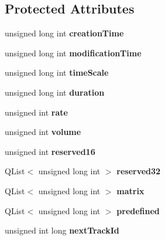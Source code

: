 \subsection*{Protected Attributes}
\begin{DoxyCompactItemize}
\item 
\hypertarget{class_movie_header_box_aa10ec3645b9839b739be8dc56eb5f080}{unsigned long int {\bfseries creation\-Time}}\label{class_movie_header_box_aa10ec3645b9839b739be8dc56eb5f080}

\item 
\hypertarget{class_movie_header_box_a5c568e1ff611aca7abda522ac1d20f38}{unsigned long int {\bfseries modification\-Time}}\label{class_movie_header_box_a5c568e1ff611aca7abda522ac1d20f38}

\item 
\hypertarget{class_movie_header_box_acf7962fac07a68e97018f76a600064e5}{unsigned long int {\bfseries time\-Scale}}\label{class_movie_header_box_acf7962fac07a68e97018f76a600064e5}

\item 
\hypertarget{class_movie_header_box_ac8813c7356944b5efcc4d5ccbce008dc}{unsigned long int {\bfseries duration}}\label{class_movie_header_box_ac8813c7356944b5efcc4d5ccbce008dc}

\item 
\hypertarget{class_movie_header_box_af82b82415e8682aba63e7a48a438b0fd}{unsigned int {\bfseries rate}}\label{class_movie_header_box_af82b82415e8682aba63e7a48a438b0fd}

\item 
\hypertarget{class_movie_header_box_a8faaa6dd6ba2e876bb36055f5274f437}{unsigned int {\bfseries volume}}\label{class_movie_header_box_a8faaa6dd6ba2e876bb36055f5274f437}

\item 
\hypertarget{class_movie_header_box_abebcda3372e107c07862cadc2a6353f2}{unsigned int {\bfseries reserved16}}\label{class_movie_header_box_abebcda3372e107c07862cadc2a6353f2}

\item 
\hypertarget{class_movie_header_box_af6b0a84485c8b8a62c0784614f0c9ee6}{Q\-List$<$ unsigned long int $>$ {\bfseries reserved32}}\label{class_movie_header_box_af6b0a84485c8b8a62c0784614f0c9ee6}

\item 
\hypertarget{class_movie_header_box_af7658e6d8db02f20faaecbc800865fe8}{Q\-List$<$ unsigned long int $>$ {\bfseries matrix}}\label{class_movie_header_box_af7658e6d8db02f20faaecbc800865fe8}

\item 
\hypertarget{class_movie_header_box_a4226b61569d5fbcae27d4fccbde0af8d}{Q\-List$<$ unsigned long int $>$ {\bfseries predefined}}\label{class_movie_header_box_a4226b61569d5fbcae27d4fccbde0af8d}

\item 
\hypertarget{class_movie_header_box_a7335502d5ace122be30e627194e7ff9a}{unsigned int long {\bfseries next\-Track\-Id}}\label{class_movie_header_box_a7335502d5ace122be30e627194e7ff9a}

\end{DoxyCompactItemize}


